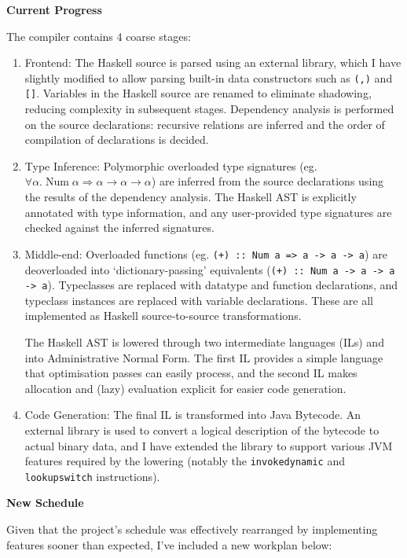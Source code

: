 \documentclass[11pt]{article}
\newcommand\haskell[1]{\texttt{#1}}
\newcommand\monospace[1]{\texttt{#1}}
\begin{document}
\large{\bf Current Progress}

The compiler contains 4 coarse stages:

\begin{enumerate}
\item
{
    Frontend: The Haskell source is parsed using an external library, which I have slightly modified to allow parsing
    built-in data constructors such as \haskell{(,)} and \haskell{[]}. Variables in the Haskell source are renamed to
    eliminate shadowing, reducing complexity in subsequent stages. Dependency analysis is performed on the source
    declarations: recursive relations are inferred and the order of compilation of declarations is decided.
}
\item
{
    Type Inference: Polymorphic overloaded type signatures (eg. \(\forall \alpha.\;\text{Num}\;\alpha \Rightarrow \alpha
    \rightarrow \alpha \rightarrow \alpha\)) are inferred from the source declarations using the results of the
    dependency analysis. The Haskell AST is explicitly annotated with type information, and any user-provided type
    signatures are checked against the inferred signatures.
}
\item
{
    Middle-end: Overloaded functions (eg. \haskell{(+) :: Num a => a -> a -> a}) are deoverloaded into
    `dictionary-passing' equivalents (\haskell{(+) :: Num a -> a -> a -> a}). Typeclasses are replaced with datatype and
    function declarations, and typeclass instances are replaced with variable declarations. These are all implemented as
    Haskell source-to-source transformations.

    The Haskell AST is lowered through two intermediate languages (ILs) and into Administrative Normal Form. The first
    IL provides a simple language that optimisation passes can easily process, and the second IL makes allocation and
    (lazy) evaluation explicit for easier code generation.
}
\item
{
    Code Generation: The final IL is transformed into Java Bytecode. An external library is used to convert a logical
    description of the bytecode to actual binary data, and I have extended the library to support various JVM features 
    required by the lowering (notably the \monospace{invokedynamic} and \monospace{lookupswitch} instructions).
}
\end{enumerate}

\large{\bf New Schedule}

Given that the project's schedule was effectively rearranged by implementing features sooner than expected, I've
included a new workplan below:
\end{document}
